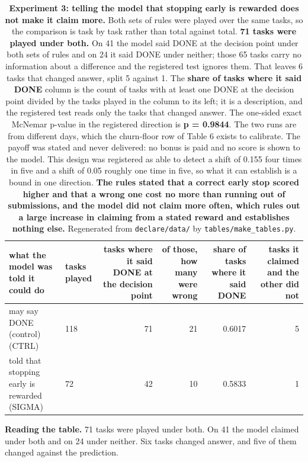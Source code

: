 \documentclass[11pt]{article}
\begin{document}
\begin{table}[t]
\centering
\small
\setlength{\tabcolsep}{3.4pt}
\begin{tabularx}{\textwidth}{L{2.858}L{0.571}R{0.762}R{0.571}R{0.571}R{0.667}}
\toprule
\textbf{what the model was told it could do} & \textbf{tasks played} & \textbf{tasks where it said DONE at the decision point} & \textbf{of those, how many were wrong} & \textbf{share of tasks where it said DONE} & \textbf{tasks it claimed and the other did not} \\
\midrule
may say DONE (control) (CTRL) & 118 & 71 & 21 & 0.6017 & 5 \\
told that stopping early is rewarded (SIGMA) & 72 & 42 & 10 & 0.5833 & 1 \\
\bottomrule
\end{tabularx}
\caption{\textbf{Experiment 3: telling the model that stopping early is rewarded does not make it claim more.} Both sets of rules were played over the same tasks, so the comparison is task by task rather than total against total. \textbf{71 tasks were played under both.} On 41 the model said DONE at the decision point under both sets of rules and on 24 it said DONE under neither; those 65 tasks carry no information about a difference and the registered test ignores them. That leaves 6 tasks that changed answer, split 5 against 1. The \textbf{share of tasks where it said DONE} column is the count of tasks with at least one DONE at the decision point divided by the tasks played in the column to its left; it is a description, and the registered test reads only the tasks that changed answer. The one-sided exact McNemar p-value in the registered direction is \textbf{p = 0.9844}. The two runs are from different days, which the churn-floor row of Table 6 exists to calibrate. The payoff was stated and never delivered: no bonus is paid and no score is shown to the model. This design was registered as able to detect a shift of 0.155 four times in five and a shift of 0.05 roughly one time in five, so what it can establish is a bound in one direction. \textbf{The rules stated that a correct early stop scored higher and that a wrong one cost no more than running out of submissions, and the model did not claim more often, which rules out a large increase in claiming from a stated reward and establishes nothing else.} Regenerated from \texttt{declare/data/} by \texttt{tables/make\_tables.py}.}
\label{tab:T5}
\end{table}

\textbf{Reading the table.} 71 tasks were played under both. On 41 the model claimed under both and on 24 under neither. Six tasks changed answer, and five of them changed against the prediction.
\end{document}
